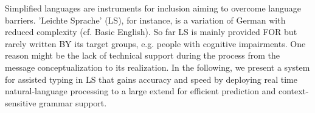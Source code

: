 Simplified languages are instruments for inclusion aiming to overcome language barriers. 'Leichte Sprache' (LS), for instance, is a variation of German with reduced complexity (cf. Basic English). So far LS is mainly provided FOR but rarely written BY its target groups, e.g. people with cognitive impairments. One reason might be the lack of technical support during the process from the message conceptualization to its realization. In the following, we present a system for assisted typing in LS that gains accuracy and speed by deploying real time natural-language processing to a large extend for efficient prediction and context-sensitive grammar support.
